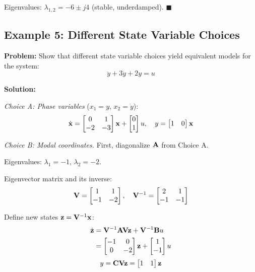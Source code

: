 Eigenvalues: $\lambda_{1,2} = -6 \pm j4$ (stable, underdamped). \hfill $\blacksquare$

\subsection{Example 5: Different State Variable Choices}

\textbf{Problem:} Show that different state variable choices yield equivalent models for the system:
\begin{equation}
    \ddot{y} + 3\dot{y} + 2y = u
\end{equation}

\textbf{Solution:}

\textit{Choice A: Phase variables} ($x_1 = y$, $x_2 = \dot{y}$):
\begin{equation}
    \dot{\mathbf{x}} = \begin{bmatrix} 0 & 1 \\ -2 & -3 \end{bmatrix} \mathbf{x} + \begin{bmatrix} 0 \\ 1 \end{bmatrix} u, \quad
    y = \begin{bmatrix} 1 & 0 \end{bmatrix} \mathbf{x}
\end{equation}

\textit{Choice B: Modal coordinates.} First, diagonalize $\mathbf{A}$ from Choice A.

Eigenvalues: $\lambda_1 = -1$, $\lambda_2 = -2$.

Eigenvector matrix and its inverse:
\begin{equation}
    \mathbf{V} = \begin{bmatrix} 1 & 1 \\ -1 & -2 \end{bmatrix}, \quad
    \mathbf{V}^{-1} = \begin{bmatrix} 2 & 1 \\ -1 & -1 \end{bmatrix}
\end{equation}

Define new states $\mathbf{z} = \mathbf{V}^{-1}\mathbf{x}$:
\begin{align}
    \dot{\mathbf{z}} &= \mathbf{V}^{-1}\mathbf{A}\mathbf{V}\mathbf{z} + \mathbf{V}^{-1}\mathbf{B}u \\
    &= \begin{bmatrix} -1 & 0 \\ 0 & -2 \end{bmatrix} \mathbf{z} + \begin{bmatrix} 1 \\ -1 \end{bmatrix} u
\end{align}
\begin{equation}
    y = \mathbf{C}\mathbf{V}\mathbf{z} = \begin{bmatrix} 1 & 1 \end{bmatrix} \mathbf{z}
\end{equation}

